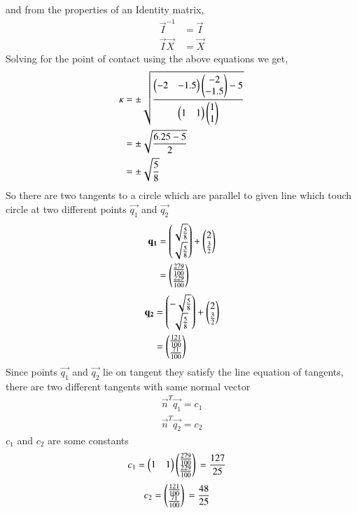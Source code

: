 and from the properties of an Identity matrix, 
\begin{align}
\vec{I}^{-1} &= \vec{I} \\
\vec{I}\vec{X} &= \vec{X}   
\end{align}
Solving for the point of contact using the above equations we get,
\begin{align}
\kappa &= \pm \sqrt{\frac{\begin{pmatrix} -2 & -1.5 \end{pmatrix}\begin{pmatrix}-2 \\ -1.5\end{pmatrix} - 5}{\begin{pmatrix}1 & 1 \end{pmatrix}\begin{pmatrix}1 \\ 1 \end{pmatrix}}} \\
&= \pm \sqrt{\frac{6.25 - 5}{2}} \\
& =  \pm \sqrt{\frac{5}{8}}\\
\end{align}
So there are two tangents to a circle which are parallel to given line which touch circle at two different points  $\vec{q_1}$ and $\vec{q_2}$
\begin{align}
\mathbf{q_1} &= \begin{pmatrix}\sqrt{\frac{5}{8}} \\ \sqrt{\frac{5}{8}}\end{pmatrix} + \begin{pmatrix}2 \\ \frac{3}{2}\end{pmatrix} \\
&= \begin{pmatrix}\frac{279}{100} \\ \frac{229}{100}\end{pmatrix}
\end{align}
\begin{align}
\mathbf{q_2} &= \begin{pmatrix}-\sqrt{\frac{5}{8}} \\ \sqrt{\frac{5}{8}}\end{pmatrix} + \begin{pmatrix}2 \\ \frac{3}{2}\end{pmatrix} \\
&= \begin{pmatrix}\frac{121}{100} \\ \frac{71}{100}\end{pmatrix}
\end{align}
Since points $\vec{q_1}$ and $\vec{q_2}$ lie on tangent they satisfy the line equation of tangents, there are two different tangents with same normal vector
\begin{align}
\vec{n}^T\vec{q_1} = c_1 
\end{align}
\begin{align}
\vec{n}^T\vec{q_2} = c_2 
\end{align}
$c_1$ and $c_2$ are some constants
\begin{align}
c_1=\myvec{1 & 1}\myvec{\frac{279}{100} \\ \frac{229}{100}}\newline
&= \frac{127}{25}
\end{align}
\newline
\begin{align}
c_2=\myvec{\frac{121}{100} \\ \frac{71}{100}}\newline
&= \frac{48}{25}
\end{align}
